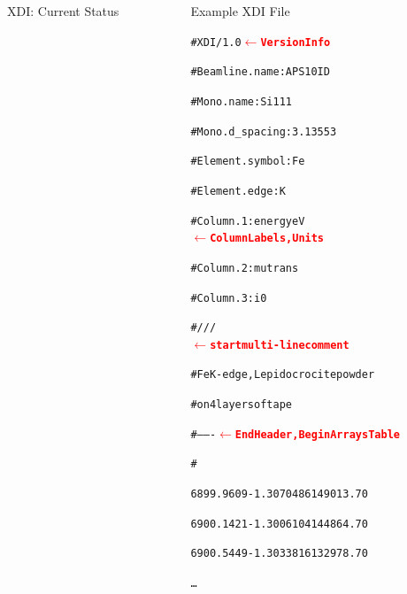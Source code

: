 \documentclass[final]{beamer}
\newcommand{\Color}[2]{{\textcolor{#1}{#2}}}
\newcommand{\BoldRed}[1]{{\Color{Red}{\bf{#1}}}}
\begin{document}
\begin{frame}{}
\begin{columns}[t]
\begin{column}{.55\linewidth}
\begin{block}{\large XDI: Current Status}
      \end{block}
      \end{column}

      \begin{column}{.42\linewidth}
        \begin{block}{Example XDI File}
          \begin{center}
            \begin{minipage}[t]{0.95\linewidth}
              \begin{alltt}
                {\footnotesize
                  \#XDI/1.0  {\BoldRed{$\leftarrow$ Version Info}}\par
                  \#Beamline.name: APS 10ID\par
                  \#Mono.name:  Si 111\par
                  \#Mono.d\_spacing: 3.13553\par
                  \#Element.symbol: Fe\par
                  \#Element.edge: K\par
                  \#Column.1: energy eV
                  {\BoldRed{$\leftarrow$ Column Labels, Units}}\par
                  \#Column.2: mutrans\par
                  \#Column.3: i0\par
                  \#///
                  {\BoldRed{$\leftarrow$ start multi-line comment}}\par
                  \#Fe K-edge, Lepidocrocite powder\par
                  \#on 4 layers of tape\par
                  \#------- {\BoldRed{$\leftarrow$ End Header, Begin Arrays Table}}\par
                  \#\par
                  \hspace{3mm} 6899.9609 -1.3070486 149013.70\par
                  \hspace{3mm} 6900.1421 -1.3006104 144864.70\par
                  \hspace{3mm} 6900.5449 -1.3033816 132978.70\par
                  \hspace{3mm} \ldots\par
                }
              \end{alltt}
            \end{minipage}
          \end{center}
        \end{block}


\end{column}
\end{columns}
\end{frame}
\end{document}
